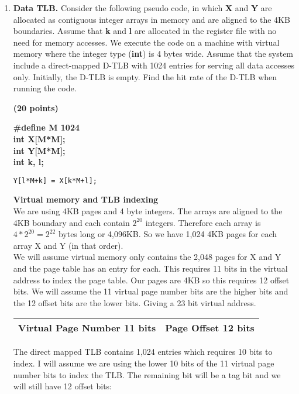 \documentclass[a4paper, 11pt]{exam}
\begin{document}
\begin{enumerate}
\item \textbf{Data TLB.}
Consider the following  pseudo code, in which \textbf{X} and \textbf{Y} are allocated as contiguous integer arrays in memory and are aligned to the 4KB boundaries.
Assume that \textbf{k} and \textbf{l} are allocated in the register file with no need for memory accesses.
We execute the code on a machine with virtual memory where the integer type (\textbf{int}) is 4 bytes wide.
Assume that the system include a direct-mapped D-TLB with 1024 entries for serving all data accesses only.
Initially, the D-TLB is empty.
Find the hit rate of the D-TLB when running the code.

\textbf{(20 points)}
\begin{algorithm}
	\textbf{\#define M 1024} \\
	\textbf{int X[M*M];} \\
	\textbf{int Y[M*M];} \\
	\textbf{int k, l;}
	\begin{algorithmic}	
		\STATE \texttt{Y[l*M+k] = X[k*M+l];}
		\ENDFOR
		\ENDFOR
	\end{algorithmic}
\end{algorithm}

\textbf{Virtual memory and TLB indexing} \\

We are using 4KB pages and 4 byte integers. The arrays are aligned to the 4KB boundary and each contain $2^{20}$ integers. Therefore each array is $4* 2^{20} = 2^{22}$ bytes long or 4,096KB. So we have 1,024 4KB pages for each array X and Y (in that order). \\

We will assume virtual memory only contains the 2,048 pages for X and Y and the page table has an entry for each. This requires 11 bits in the virtual address to index the page table. Our pages are 4KB so this requires 12 offset bits. We will assume the 11 virtual page number bits are the higher bits and the 12 offset bits are the lower bits. Giving a 23 bit virtual address.

\begin{center}
	\begin{tabular}{|c|c|}
		\hline
		Virtual Page Number 11 bits & Page Offset 12 bits\\
		\hline
	\end{tabular}
\end{center}

The direct mapped TLB contains 1,024 entries which requires 10 bits to index. I will assume we are using the lower 10 bits of the 11 virtual page number bits to index the TLB. The remaining bit will be a tag bit and we will still have 12 offset bits:


\end{enumerate}
\end{document}
